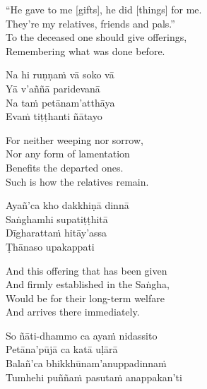 \begin{english-verses}
  ``He gave to me [gifts], he did [things] for me.\\
  They're my relatives, friends and pals.''\\
  To the deceased one should give offerings,\\
  Remembering what was done before.
\end{english-verses}

\begin{pali-hang-continued}
  Na hi ruṇṇaṁ vā soko vā\\
  Yā v'aññā paridevanā\\
  Na taṁ petānam'atthāya\\
  Evaṁ tiṭṭhanti ñātayo
\end{pali-hang-continued}

\begin{english-verses}
  For neither weeping nor sorrow,\\
  Nor any form of lamentation\\
  Benefits the departed ones.\\
  Such is how the relatives remain.
\end{english-verses}

\ifninebythirteen\clearpage\fi

\begin{pali-hang-continued}
  Ayañ'ca kho dakkhiṇā dinnā\\
  Saṅghamhi supatiṭṭhitā\\
  Dīgharattaṁ hitāy'assa\\
  Ṭhānaso upakappati
\end{pali-hang-continued}

\ifbfive\clearpage\fi

\begin{english-verses}
  And this offering that has been given\\
  And firmly established in the Saṅgha,\\
  \ifbfive\enlargethispage{1\baselineskip}\fi
  Would be for their long-term welfare\\
  And arrives there immediately.
\end{english-verses}

\begin{pali-hang-continued}
  So ñāti-dhammo ca ayaṁ nidassito\\
  Petāna'pūjā ca katā uḷārā\\
  Balañ'ca bhikkhūnam'anuppadinnaṁ\\
  Tumhehi puññaṁ pasutaṁ anappakan'ti
\end{pali-hang-continued}

